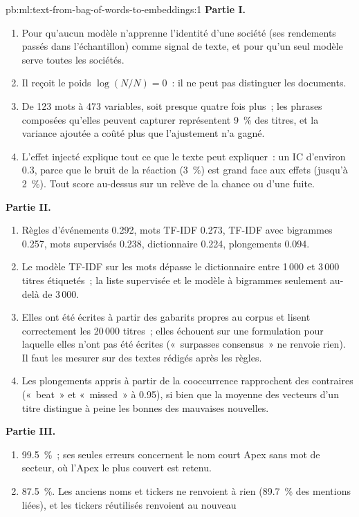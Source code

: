 \begin{solution}{pb:ml:text-from-bag-of-words-to-embeddings:1}
\textbf{Partie I.}
\begin{enumerate}
\item Pour qu'aucun modèle n'apprenne l'identité d'une société (ses rendements passés dans l'échantillon) comme signal de texte, et pour qu'un seul modèle
serve toutes les sociétés.
\item Il reçoit le poids $\log(N/N) = 0$~: il ne peut pas distinguer les documents.
\item De 123 mots à 473 variables, soit presque quatre fois plus~; les phrases composées qu'elles peuvent capturer représentent 9~\% des titres,
et la variance ajoutée a coûté plus que l'ajustement n'a gagné.
\item L'effet injecté explique tout ce que le texte peut expliquer~: un IC d'environ 0.3, parce que le bruit de la réaction (3~\%) est grand face
aux effets (jusqu'à 2~\%). Tout score au-dessus sur un  relève de la chance ou d'une fuite.
\end{enumerate}
\textbf{Partie II.}
\begin{enumerate}[resume]
\item Règles d'événements 0.292, mots TF-IDF 0.273, TF-IDF avec bigrammes 0.257, mots supervisés 0.238, dictionnaire 0.224,
plongements 0.094.
\item Le modèle TF-IDF sur les mots dépasse le dictionnaire entre 1\,000 et 3\,000 titres étiquetés~; la liste supervisée et
le modèle à bigrammes seulement au-delà de 3\,000.
\item Elles ont été écrites à partir des gabarits propres au corpus et lisent correctement les 20\,000 titres~; elles échouent sur une formulation
pour laquelle elles n'ont pas été écrites («~surpasses consensus~» ne renvoie rien). Il faut les mesurer sur des textes rédigés après les règles.
\item Les plongements appris à partir de la cooccurrence rapprochent des contraires («~beat~» et «~missed~» à 0.95), si bien que la moyenne des
vecteurs d'un titre distingue à peine les bonnes des mauvaises nouvelles.
\end{enumerate}
\textbf{Partie III.}
\begin{enumerate}[resume]
\item 99.5~\%~; ses seules erreurs concernent le nom court Apex sans mot de secteur, où l'Apex le plus couvert est retenu.
\item 87.5~\%. Les anciens noms et tickers ne renvoient à rien (89.7~\% des mentions liées), et les tickers réutilisés renvoient au nouveau

\end{enumerate}
\end{solution}
